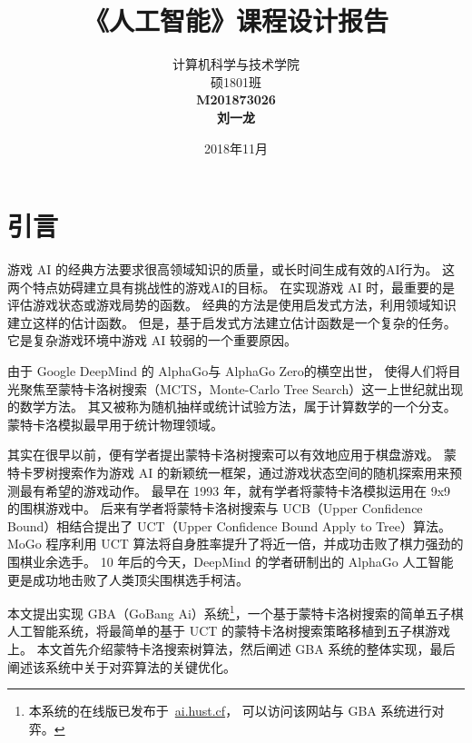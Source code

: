 \documentclass[UTF8,cs4size]{ctexart}
\title{{\LARGE《\textbf{人工智能}》课程设计报告}\\ \bigskip \bigskip \bigskip {\Large 选题名称：\textbf{GBA - 一个基于蒙特卡洛树搜索的简单五子棋人工智能系统}} \vspace{8cm}}
\author{计算机科学与技术学院\\ 硕1801班\\ \textbf{M201873026}\\ \textbf{刘一龙}}
\date{2018年11月}
\begin{document}
\maketitle
\newpage
\null\thispagestyle{empty}
\newpage


\tableofcontents
\newpage
\null\thispagestyle{empty}
\newpage


\section{引言}
游戏 AI 的经典方法要求很高领域知识的质量，或长时间生成有效的AI行为。
这两个特点妨碍建立具有挑战性的游戏AI的目标。
在实现游戏 AI 时，最重要的是评估游戏状态或游戏局势的函数。
经典的方法是使用启发式方法，利用领域知识建立这样的估计函数。
但是，基于启发式方法建立估计函数是一个复杂的任务。
它是复杂游戏环境中游戏 AI 较弱的一个重要原因。

由于 Google DeepMind 的 AlphaGo\cite{DBLP:journals/nature/SilverHMGSDSAPL16}与 AlphaGo Zero\cite{silver2017mastering}的横空出世，
使得人们将目光聚焦至蒙特卡洛树搜索（MCTS，Monte-Carlo Tree Search）\cite{wiki:Monte_Carlo_tree_search}这一上世纪就出现的数学方法。
其又被称为随机抽样或统计试验方法，属于计算数学的一个分支。蒙特卡洛模拟\cite{binder1993monte}最早用于统计物理领域。

其实在很早以前，便有学者提出蒙特卡洛树搜索可以有效地应用于棋盘游戏\cite{DBLP:conf/aiide/ChaslotBSS08}。
蒙特卡罗树搜索作为游戏 AI 的新颖统一框架，通过游戏状态空间的随机探索用来预测最有希望的游戏动作。
最早在 1993 年\cite{brugmann1993monte}，就有学者将蒙特卡洛模拟运用在 9x9 的围棋游戏中。
后来有学者将蒙特卡洛树搜索与 UCB（Upper Confidence Bound）相结合提出了 UCT（Upper Confidence Bound Apply to Tree）算法\cite{DBLP:conf/ecml/KocsisS06}。
MoGo 程序\cite{DBLP:conf/cig/WangG07}\cite{DBLP:conf/icml/GellyS07}利用 UCT 算法将自身胜率提升了将近一倍，并成功击败了棋力强劲的围棋业余选手。
10 年后的今天，DeepMind 的学者研制出的 AlphaGo 人工智能更是成功地击败了人类顶尖围棋选手柯洁。

本文提出实现 GBA（GoBang Ai）系统\footnote{本系统的在线版已发布于~\href{http://ai.hust.cf}{ai.hust.cf}，
可以访问该网站与 GBA 系统进行对弈。}，一个基于蒙特卡洛树搜索的简单五子棋人工智能系统，将最简单的基于 UCT 的蒙特卡洛树搜索策略移植到五子棋游戏上。
本文首先介绍蒙特卡洛搜索树算法，然后阐述 GBA 系统的整体实现，最后阐述该系统中关于对弈算法的关键优化。
\newpage
\end{document}
